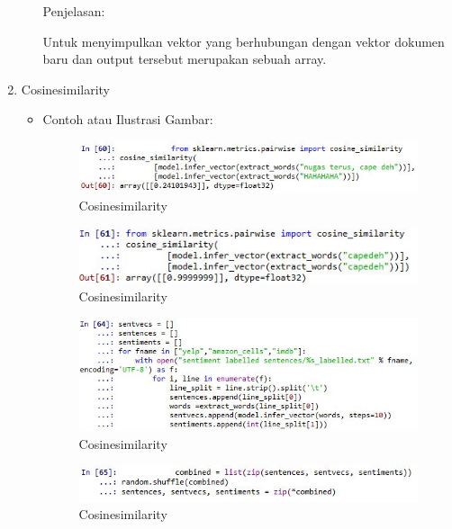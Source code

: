 \begin{enumerate}
\begin{itemize}
Penjelasan:

Untuk menyimpulkan vektor yang berhubungan dengan vektor dokumen baru dan output tersebut merupakan sebuah array.

\end{itemize}

\item Cosinesimilarity
\begin{itemize}
\item Contoh atau Ilustrasi Gambar:

\begin{figure}[!hbtp]
\centering
\includegraphics[scale=0.7]{figures/1174031/5/52.jpg}
\caption{Cosinesimilarity}
\label{Cosinesimilarity}
\end{figure}

\begin{figure}[!hbtp]
\centering
\includegraphics[scale=0.7]{figures/1174031/5/53.jpg}
\caption{Cosinesimilarity}
\label{Cosinesimilarity}
\end{figure}

\begin{figure}[!hbtp]
\centering
\includegraphics[scale=0.7]{figures/1174031/5/54.jpg}
\caption{Cosinesimilarity}
\label{Cosinesimilarity}
\end{figure}

\begin{figure}[!hbtp]
\centering
\includegraphics[scale=0.7]{figures/1174031/5/55.jpg}
\caption{Cosinesimilarity}
\label{Cosinesimilarity}
\end{figure}


\end{itemize}
\end{enumerate}
